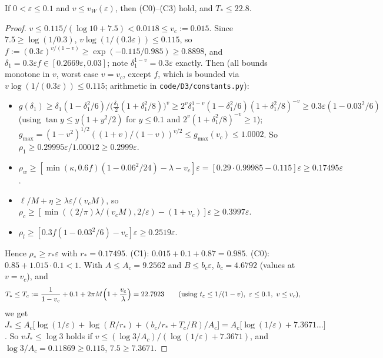 \begin{lemma}[W6: constants]\label{lem:D3-W6}
If $0<\varepsilon\le0.1$ and $v\le v_W(\varepsilon)$, then \textup{(C0)--(C3)} hold, and $T_*\le22.8$.
\end{lemma}
\begin{proof}
$v\le0.115/(\log10+7.5)<0.0118\le v_c:=0.015$. Since $7.5\ge\log(1/0.3)$, $v\log(1/(0.3\varepsilon))\le0.115$, so
$f:=(0.3\varepsilon)^{v/(1-v)}\ge\exp(-0.115/0.985)\ge0.8898$, and $\delta_1=0.3\varepsilon f\in[0.2669\varepsilon,0.03]$; note
$\delta_1^{1-v}=0.3\varepsilon$ exactly. Then (all bounds monotone in $v$, worst case $v=v_c$, except $f$, which is bounded via
$v\log(1/(0.3\varepsilon))\le0.115$; arithmetic in \texttt{code/D3/constants.py}):
\begin{itemize}
\item $g(\delta_1)\ge\delta_1(1-\delta_1^2/6)/\bigl(\tfrac{\delta_1}{2}(1+\delta_1^2/8)\bigr)^v
\ge2^v\delta_1^{1-v}(1-\delta_1^2/6)(1+\delta_1^2/8)^{-v}\ge0.3\varepsilon(1-0.03^2/6)$ (using $\tan y\le y(1+y^2/2)$ for $y\le0.1$
and $2^v(1+\delta_1^2/8)^{-v}\ge1$); $g_{\max}=(1-v^2)^{1/2}((1+v)/(1-v))^{v/2}\le g_{\max}(v_c)\le1.0002$. So
$\rho_1\ge0.29995\varepsilon/1.00012\ge0.2999\varepsilon$.
\item $\rho_w\ge[\min(\kappa,0.6f)(1-0.06^2/24)-\lambda-v_c]\varepsilon=[0.29\cdot0.99985-0.115]\varepsilon\ge0.17495\varepsilon$.
\item $\ell/M+\eta\ge\lambda\varepsilon/(v_cM)$, so
$\rho_c\ge[\min((2/\pi)\lambda/(v_cM),2/\varepsilon)-(1+v_c)]\varepsilon\ge0.3997\varepsilon$.
\item $\rho_l\ge[0.3f(1-0.03^2/6)-v_c]\varepsilon\ge0.2519\varepsilon$.
\end{itemize}
Hence $\rho_*\ge r_*\varepsilon$ with $r_*=0.17495$. (C1): $0.015+0.1+0.87=0.985$. (C0): $0.85+1.015\cdot0.1<1$.
With $A\le A_c=9.2562$ and $B\le b_c\varepsilon$, $b_c=4.6792$ (values at $v=v_c$), and
\[
T_*\le T_c:=\frac{1}{1-v_c}+0.1+2\pi M\Bigl(1+\frac{v_c}{\lambda}\Bigr)=22.7923
\qquad(\text{using }t_\varepsilon\le1/(1-v),\ \varepsilon\le0.1,\ v\le v_c),
\]
we get
$J_*\le A_c\bigl[\log(1/\varepsilon)+\log(R/r_*)+(b_c/r_*+T_c/R)/A_c\bigr]=A_c\bigl[\log(1/\varepsilon)+7.3671\ldots\bigr]$. So
$vJ_*\le\log3$ holds if $v\le(\log3/A_c)/(\log(1/\varepsilon)+7.3671)$, and $\log3/A_c=0.11869\ge0.115$, $7.5\ge7.3671$.
\end{proof}

